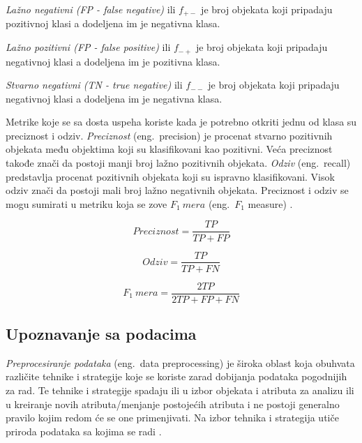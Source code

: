 \documentclass[12pt,oneside]{memoir}
\begin{document}
\textit{Lažno negativni (FP - false negative)} ili $f_{+-}$ je broj objekata koji pripadaju pozitivnoj klasi a dodeljena im je negativna klasa.

\textit{Lažno pozitivni (FP - false positive)} ili $f_{-+}$ je broj objekata koji pripadaju negativnoj klasi a dodeljena im je pozitivna klasa.

\textit{Stvarno negativni (TN - true negative)} ili $f_{--}$ je broj objekata koji pripadaju negativnoj klasi a dodeljena im je negativna klasa.

Metrike koje se sa dosta uspeha koriste kada je potrebno otkriti jednu od klasa su preciznost i odziv. \textit{Preciznost} (eng.~precision) je procenat stvarno pozitivnih objekata među objektima koji su klasifikovani kao pozitivni. Veća preciznost takođe znači da postoji manji broj lažno pozitivnih objekata. \textit{Odziv} (eng.~recall) predstavlja procenat pozitivnih objekata koji su ispravno klasifikovani. Visok odziv znači da postoji mali broj lažno negativnih objekata. Preciznost i odziv se mogu sumirati u metriku koja se zove $F_1\ mera$ (eng.~$F_1$ measure)  \cite{mitic}.

$$ \textit{Preciznost} = \frac{TP}{TP+FP} $$

$$ \textit{Odziv} = \frac{TP}{TP+FN} $$ 

$$ F_1\ mera = \frac{2TP}{2TP+FP+FN}$$



\subsection{Upoznavanje sa podacima}  \label{upoznavanje}

\textit{Preprocesiranje podataka} (eng.~data preprocessing) je široka oblast koja obuhvata različite tehnike i strategije koje se koriste zarad dobijanja podataka pogodnijih za rad. Te tehnike i strategije spadaju ili u izbor objekata i atributa za analizu ili u kreiranje novih atributa/menjanje postojećih atributa i ne postoji generalno pravilo kojim redom će se one primenjivati. Na izbor tehnika i strategija utiče priroda podataka sa kojima se radi \cite{mitic}. 
\end{document}
